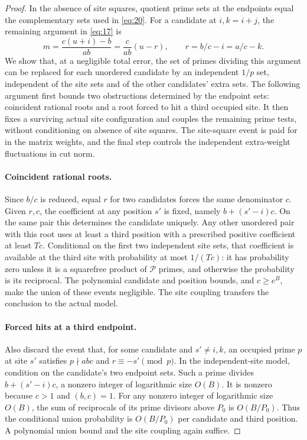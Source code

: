 \begin{proof}
In the absence of site squares, quotient prime sets at the
endpoints equal the complementary sets used in \eqref{eq:20}.
For a candidate at $i,k=i+j$, the remaining argument in
\eqref{eq:17} is
\begin{equation}\label{eq:22}
 m=\frac{c(u+i)-b}{ab}
   =\frac{c}{ab}(u-r),\qquad r=b/c-i=a/c-k.
\end{equation}
We show that, at a negligible total error, the set of primes
dividing this argument can be replaced for each unordered
candidate by an independent $1/p$ set, independent of the site
sets and of the other candidates' extra sets. The following
argument first bounds two obstructions determined by the endpoint sets:
coincident rational roots and a root forced to hit a third occupied site.
It then fixes a surviving actual site configuration and couples the
remaining prime tests, without conditioning on absence of site squares.
The site-square event is paid for in the matrix weights, and the final
step controls the independent extra-weight fluctuations in cut norm.

\paragraph{Coincident rational roots.}
Since $b/c$ is reduced, equal $r$ for two candidates forces the
same denominator $c$. Given $r,c$, the coefficient at any
position $s'$ is fixed, namely $b+(s'-i)c$. On the same pair
this determines the candidate uniquely. Any other unordered
pair with this root uses at least a third position with a
prescribed positive coefficient at least $Tc$. Conditional on
the first two independent site sets, that coefficient is
available at the third site with probability at most $1/(Tc)$:
it has probability zero unless it is a squarefree product of
$\mathcal P$ primes, and otherwise the probability is its
reciprocal. The polynomial candidate and position bounds,
and $c\ge e^B$, make the union of these events negligible.
The site coupling transfers the conclusion to the actual model.

\paragraph{Forced hits at a third endpoint.}
Also discard the event that, for some candidate and
$s'\ne i,k$, an occupied prime $p$ at site $s'$ satisfies
$p\nmid abc$ and $r\equiv-s'\pmod p$.
In the independent-site model, condition on the candidate's
two endpoint sets. Such a prime divides
$b+(s'-i)c$, a nonzero integer of logarithmic size $O(B)$.
It is nonzero because $c>1$ and $(b,c)=1$.
For any nonzero integer of logarithmic size $O(B)$, the sum
of reciprocals of its prime divisors above $P_0$ is
$O(B/P_0)$. Thus the conditional union probability is
$O(B/P_0)$ per candidate and third position. A polynomial
union bound and the site coupling again suffice.


\end{proof}
